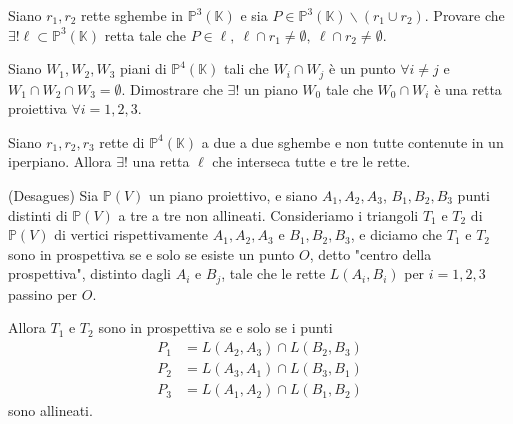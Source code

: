 \begin{exc}
Siano $r_1,r_2$ rette sghembe in $\mathbb{P}^3(\mathbb{K})$ e sia $P \in \mathbb{P}^3(\mathbb{K}) \smallsetminus (r_1 \cup r_2)$. Provare che $\exists ! \ell \subset \mathbb{P}^3(\mathbb{K})$ retta tale che $P \in \ell,\ \ell \cap r_1 \neq \emptyset,\ \ell \cap r_2 \neq \emptyset$.
\end{exc}

\begin{exc}
Siano $W_1,W_2,W_3$ piani di $\mathbb{P}^4(\mathbb{K})$ tali che $W_i \cap W_j$ è un punto $\forall i \neq j$ e $W_1 \cap W_2 \cap W_3 =\emptyset$. Dimostrare che $\exists !$ un piano $W_0$ tale che $W_0 \cap W_i$ è una retta proiettiva $\forall i=1,2,3$.
\end{exc}

\begin{exc}
Siano $r_1,r_2,r_3$ rette di $\mathbb{P}^4(\mathbb{K})$ a due a due sghembe e non tutte contenute in un iperpiano. Allora $\exists !$ una retta $\ell$ che interseca tutte e tre le rette.
\end{exc}

\begin{thm}
(Desagues) Sia $\mathbb{P}(V)$ un piano proiettivo, e siano $A_1,A_2,A_3$, $B_1,B_2,B_3$ punti distinti di $\mathbb{P}(V)$ a tre a tre non allineati. Consideriamo i triangoli $T_1$ e $T_2$ di $\mathbb{P}(V)$ di vertici rispettivamente $A_1,A_2,A_3$ e $B_1,B_2,B_3$, e diciamo che $T_1$ e $T_2$ sono in prospettiva se e solo se esiste un punto $O$, detto "centro della prospettiva", distinto dagli $A_i$ e $B_j$, tale che le rette $L(A_i,B_i)$ per $i=1,2,3$ passino per $O$.

Allora $T_1$ e $T_2$ sono in prospettiva se e solo se i punti
\begin{align*}
P_1&=L(A_2,A_3) \cap L(B_2,B_3)\\ P_2&=L(A_3,A_1) \cap L(B_3,B_1)\\ P_3&=L(A_1,A_2) \cap L(B_1,B_2)
\end{align*}
sono allineati.
\end{thm}

